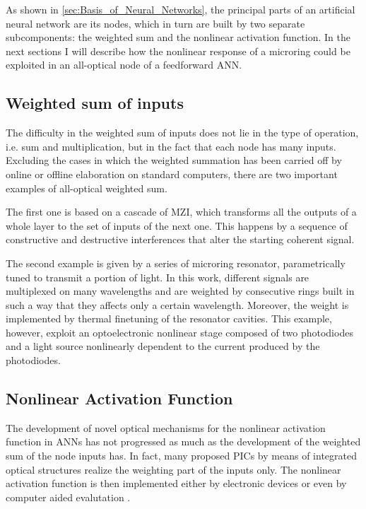 As shown in \autoref{sec:Basis_of_Neural_Networks}, the principal parts of an artificial neural network are its nodes, which in turn are built by two separate subcomponents: the weighted sum and the nonlinear activation function.
In the next sections I will describe how the nonlinear response of a microring could be exploited in an all-optical node of a feedforward \ac{ANN}.

\subsection{Weighted sum of inputs}
\label{ssec:Weighted_Sum_of_inputs}
The difficulty in the weighted sum of inputs does not lie in the type of operation, i.e. sum and multiplication, but in the fact that each node has many inputs.
Excluding the cases in which the weighted summation has been carried off by online or offline elaboration on standard computers, there are two important examples of all-optical weighted sum.

The first one \cite{Shen2017} is based on a cascade of \acf{MZI}, which transforms all the outputs of a whole layer to the set of inputs of the next one.
This happens by a sequence of constructive and destructive interferences that alter the starting coherent signal.

The second example \cite{Tait2017} is given by a series of microring resonator, parametrically tuned to transmit a portion of light.
In this work, different signals are multiplexed on many wavelengths and are weighted by consecutive rings built in such a way that they affects only a certain wavelength.
Moreover, the weight is implemented by thermal finetuning of the resonator cavities.
This example, however, exploit an optoelectronic nonlinear stage composed of two photodiodes and a light source nonlinearly dependent to the current produced by the photodiodes.

\subsection{Nonlinear Activation Function}
\label{ssec:Nonlinear_Activation_Function}
The development of novel optical mechanisms for the nonlinear activation function in \acsp{ANN} has not progressed as much as the development of the weighted sum of the node inputs has.
In fact, many proposed \acsp{PIC} by means of integrated optical structures realize the weighting part of the inputs only.
The nonlinear activation function is then implemented either by electronic devices \cite{Tait2017} or even by computer aided evalutation \cite{Shen2017}.

